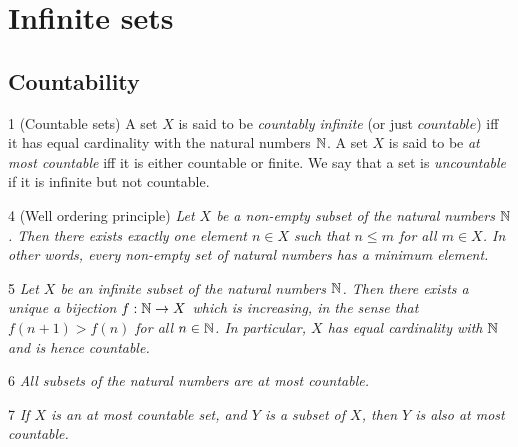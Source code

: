 \section{Infinite sets}\label{a1-ch8}
\subsection{Countability}
\begin{definition}{1}
    \label{countable}
    (Countable sets) A set $X$ is said to be \emph{countably infinite} (or just $countable$)
    iff it has equal cardinality with the natural numbers $\mathbb{N}$. A set $X$
    is said to be \emph{at most countable} iff it is either countable or finite.
    We say that a set is \emph{uncountable} if it is infinite but not countable.
\end{definition}

\begin{proposition}{4}
    \label{well-ordering}
    (Well ordering principle) \emph{Let $X$ be a non-empty subset of the natural
    numbers $\mathbb{N}$. Then there exists exactly one element $n \in X$ such that
    $n \leq m$ for all $m \in X$. In other words, every non-empty set of natural
    numbers has a minimum element.}
\end{proposition}

\begin{proposition}{5}
    \label{infinite-subset-nat}
    \emph{Let $X$ be an infinite subset of the natural numbers $\mathbb{N}$. Then
    there exists a unique a bijection $f: \mathbb{N} \to X$ which is increasing,
    in the sense that $f(n + 1) > f(n)$ for all $n \in \mathbb{N}$. In particular,
    $X$ has equal cardinality with $\mathbb{N}$ and is hence countable.}
\end{proposition}

\begin{corollary}{6}
    \label{nat-subsets-countable}
    \emph{All subsets of the natural numbers are at most countable.}
\end{corollary}

\begin{corollary}{7}
    \label{countable-subset}
    \emph{If $X$ is an at most countable set, and $Y$ is a subset of $X$, then
    $Y$ is also at most countable.}
\end{corollary}

